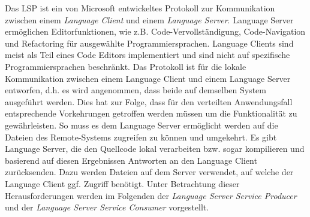 Das \acl{LSP} ist ein von Microsoft entwickeltes Protokoll zur Kommunikation zwischen einem \textit{Language Client} und einem \textit{Language Server}. Language Server ermöglichen Editorfunktionen, wie z.B. Code-Vervollständigung, Code-Navigation und Refactoring für ausgewählte Programmiersprachen. Language Clients sind meist als Teil eines Code Editors implementiert und sind nicht auf spezifische Programmiersprachen beschränkt. Das Protokoll ist für die lokale Kommunikation zwischen einem Language Client und einem Language Server entworfen, d.h. es wird angenommen, dass beide auf demselben System ausgeführt werden. Dies hat zur Folge, dass für den verteilten Anwendungsfall entsprechende Vorkehrungen getroffen werden müssen um die Funktionalität zu gewährleisten. So muss es dem Language Server ermöglicht werden auf die Dateien des Remote-Systems zugreifen zu können und umgekehrt. Es gibt Language Server, die den Quellcode lokal verarbeiten bzw. sogar kompilieren und basierend auf diesen Ergebnissen Antworten an den Language Client zurücksenden. Dazu werden Dateien auf dem Server verwendet, auf welche der Language Client ggf. Zugriff benötigt. Unter Betrachtung dieser Herausforderungen werden im Folgenden der \textit{Language Server Service Producer} und der \textit{Language Server Service Consumer} vorgestellt.


